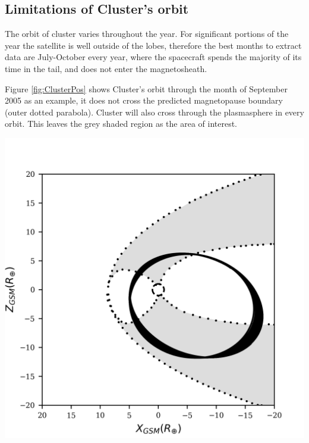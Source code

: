 \documentclass[12pt]{article}
\newenvironment{Figure}
  {\par\medskip\noindent\minipage{\linewidth}}
  {\endminipage\par\medskip}
\begin{document}
\subsection{Limitations of Cluster's orbit}
The orbit of cluster varies throughout the year. For significant portions of the year the satellite is well outside of the lobes, therefore the best months to extract data are July-October every year, where the spacecraft spends the majority of its time in the tail, and does not enter the magnetosheath. 

Figure \ref{fig:ClusterPos} shows Cluster's orbit through the month of September 2005 as an example, it does not cross the predicted magnetopause boundary (outer dotted parabola). Cluster will also cross through the plasmasphere in every orbit. This leaves the grey shaded region as the area of interest.

\begin{Figure}
    \begin{minipage}[c]{0.4\textwidth}
        \centering
        \includegraphics[width=\textwidth]{sc_pos_09_05_coloured.png}
    \end{minipage}\hfill
    \begin{minipage}[c]{0.57\textwidth}
        \label{fig:ClusterPos}
    \end{minipage}
\end{Figure}
\end{document}

